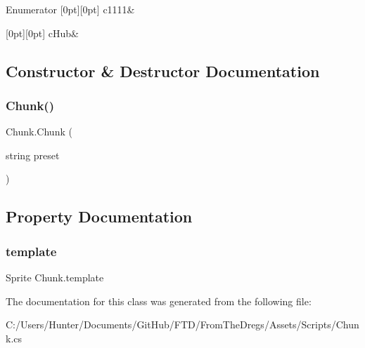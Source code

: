 \begin{DoxyEnumFields}{Enumerator}
[0pt][0pt]{}\mbox{\label{class_chunk_ab2e9c44541a726c19e8f0afbcf82894ca9e8ec7bc0f7942c2c9bc32bfbbd3b591}} 
c1111&\\
\hline

[0pt][0pt]{}\mbox{\label{class_chunk_ab2e9c44541a726c19e8f0afbcf82894ca7c5516c9c767eb37d179548e7e42eee8}} 
c\+Hub&\\
\hline

\end{DoxyEnumFields}


\subsection{Constructor \& Destructor Documentation}
\mbox{\label{class_chunk_a2cf36203919b3a5512c2dd5dc60c446b}} 
\subsubsection{\texorpdfstring{Chunk()}{Chunk()}}
{\footnotesize\ttfamily Chunk.\+Chunk (\begin{DoxyParamCaption}\item[{string}]{preset }\end{DoxyParamCaption})}



\subsection{Property Documentation}
\mbox{\label{class_chunk_a90851ff2883364a1e00753d1fd35461b}} 
\subsubsection{\texorpdfstring{template}{template}}
{\footnotesize\ttfamily Sprite Chunk.\+template\hspace{0.3cm}{\ttfamily [get]}}



The documentation for this class was generated from the following file\+:\begin{DoxyCompactItemize}
\item 
C\+:/\+Users/\+Hunter/\+Documents/\+Git\+Hub/\+F\+T\+D/\+From\+The\+Dregs/\+Assets/\+Scripts/Chunk.\+cs\end{DoxyCompactItemize}
